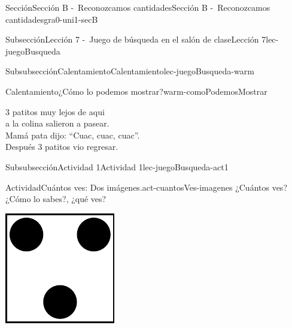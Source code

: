 \documentclass[twoside,10pt,]{article}
\begin{document}
\begin{sectionptx}{Sección}{Sección B -~Reconozcamos cantidades}{}{Sección B -~Reconozcamos cantidades}{}{}{gra0-uni1-secB}
\begin{subsectionptx}{Subsección}{Lección 7 -~Juego de búsqueda en el salón de clase}{}{Lección 7}{}{}{lec-juegoBusqueda}
\begin{subsubsectionptx}{Subsubsección}{Calentamiento}{}{Calentamiento}{}{}{lec-juegoBusqueda-warm}
\begin{exploration}{Calentamiento}{¿Cómo lo podemos mostrar?}{warm-comoPodemosMostrar}
\begin{image}{0.2}{0.6}{0.2}{}
\end{image}%
%
\par
3 patitos muy lejos de aqui\\
 a la colina salieron a pasear.\\
 Mamá pata dijo: “Cuac, cuac, cuac”.\\
 Después 3 patitos vio regresar.%
\end{exploration}%
\end{subsubsectionptx}
%
%
\typeout{************************************************}
\typeout{************************************************}
%
\begin{subsubsectionptx}{Subsubsección}{Actividad 1}{}{Actividad 1}{}{}{lec-juegoBusqueda-act1}
\begin{activity}{Actividad}{Cuántos ves: Dos imágenes.}{act-cuantosVes-imagenes}%
¿Cuántos ves?\\
 ¿Cómo lo sabes?, ¿qué ves?%
\begin{sidebyside}{2}{0}{0}{0}%
\begin{sbspanel}{0.5}%
\includegraphics[width=\linewidth]{external/svg-source/tikz-file-148152.pdf}
\end{sbspanel}%
\begin{sbspanel}{0.5}%

\end{sbspanel}
\end{sidebyside}
\end{activity}
\end{subsubsectionptx}
\end{subsectionptx}
\end{sectionptx}
\end{document}
